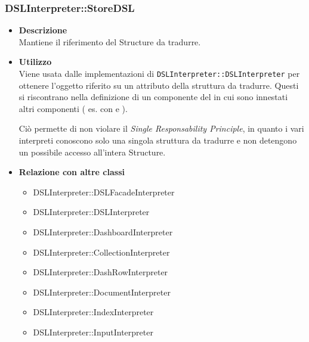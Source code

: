 \subsubsection{DSLInterpreter::StoreDSL}
\begin{itemize}
\item \textbf{Descrizione} \hfill \\
  Mantiene il riferimento del  Structure da tradurre.
\item \textbf{Utilizzo} \hfill \\
  Viene usata dalle implementazioni di \texttt{DSLInterpreter::DSLInterpreter} per ottenere l'oggetto riferito su un attributo della struttura da tradurre. Questi  si riscontrano nella definizione di un componente del  in cui sono innestati altri componenti ( es.  con  e  ).

  Ciò permette di non violare il \textit{Single Responsability Principle}, in quanto i vari interpreti conoscono solo una singola struttura da tradurre e non detengono un possibile accesso all'intera  Structure.
\item \textbf{Relazione con altre classi} \hfill
  \begin{itemize}
  \item DSLInterpreter::DSLFacadeInterpreter
  \item DSLInterpreter::DSLInterpreter
  \item DSLInterpreter::DashboardInterpreter
  \item DSLInterpreter::CollectionInterpreter
  \item DSLInterpreter::DashRowInterpreter
  \item DSLInterpreter::DocumentInterpreter
  \item DSLInterpreter::IndexInterpreter
  \item DSLInterpreter::InputInterpreter
  \end{itemize}
\end{itemize}
